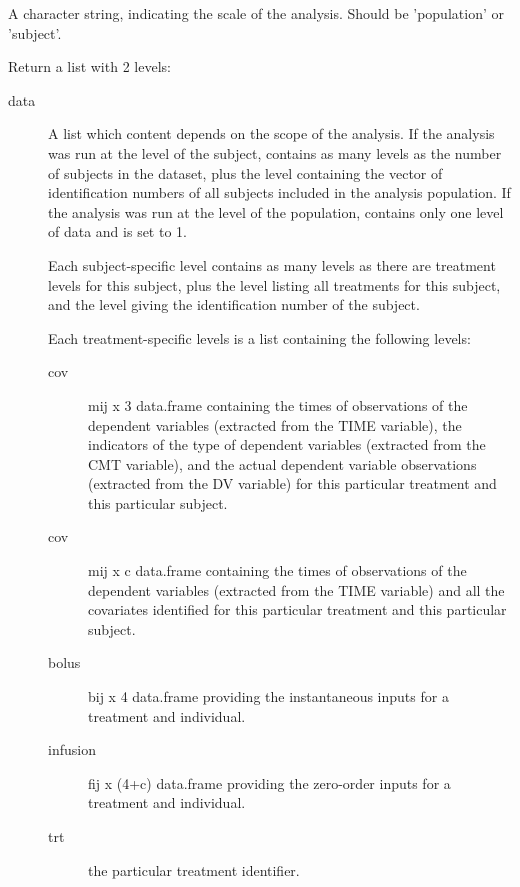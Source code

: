 \begin{Arguments}
\begin{ldescription}
\begin{description}
\end{description}


\item[\code{method}] A character string, indicating the scale of the analysis. Should
be 'population' or 'subject'.
\end{ldescription}
\end{Arguments}
%
\begin{Value}
Return a list with 2 levels: \begin{description}

\item[data] A list which content depends on the scope of the analysis. If 
the analysis was run at the level of the subject,  contains as 
many levels as the number of subjects in the dataset, plus the  
level containing the vector of identification numbers of all subjects 
included in the analysis population. If the analysis was run at the level 
of the population,  contains only one level of data and 
 is set to 1.

Each subject-specific level contains as many levels as there are treatment
levels for this subject, plus the  level listing all treatments
for this subject, and the  level giving the identification number
of the subject. 

Each treatment-specific levels is a list containing the following levels: 
\begin{description}

\item[cov] mij x 3 data.frame containing the times of observations of the
dependent variables (extracted from the TIME variable), the indicators
of the type of dependent variables (extracted from the CMT variable),
and the actual dependent variable observations (extracted from the 
DV variable) for this particular treatment and this particular 
subject.
\item[cov] mij x c data.frame containing the times of observations of 
the dependent variables (extracted from the TIME variable) and all the
covariates identified for this particular treatment and this 
particular subject.
\item[bolus] bij x 4 data.frame providing the instantaneous inputs for
a treatment and individual.
\item[infusion] fij x (4+c) data.frame providing the zero-order inputs for
a treatment and individual.
\item[trt] the particular treatment identifier.


\end{description}
\end{description}
\end{Value}
